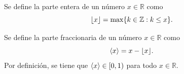 \begin{definition}
    Se define la parte entera de un número $x\in \mathbb{R}$ como 
    \[
        \lfloor x \rfloor = \max \{k \in \mathbb{Z}: k \leq x\}.
    \]
\end{definition} 

\begin{definition}
    Se define la parte fraccionaria de un número $x\in \mathbb{R}$ como
    \[
        \langle x \rangle = x - \lfloor x \rfloor.
    \]
    Por definición, se tiene que $\langle x \rangle \in [0,1)$ para todo $x \in \mathbb{R}$.
\end{definition}